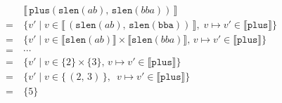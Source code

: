 {\addtolength{\jot}{-.5ex}
\begin{align*}
  & \llbracket\,\texttt{plus}(\texttt{slen}(ab),\,\texttt{slen}(bba))\,\rrbracket \\
=~& \{ v' \mid
       v \in \llbracket\,(\texttt{slen}(ab),\,\texttt{slen}(\texttt{bba}))\,\rrbracket,\;
       v\mapsto v' \in \llbracket\texttt{plus}\rrbracket \} \\
=~& \{ v' \mid
       v \in \llbracket\texttt{slen}(ab)\rrbracket\times
             \llbracket\texttt{slen}(bba)\rrbracket,\,
       v\mapsto v' \in \llbracket\texttt{plus}\rrbracket \} \\
=~& \cdots \\
=~& \{ v' \mid
       v \in \{2\}\times\{3\},\,
       v\mapsto v' \in \llbracket\texttt{plus}\rrbracket \} \\
=~& \{ v' \mid v\in \{\,(2,\,3)\,\},~\;
       v\mapsto v' \in \llbracket\texttt{plus}\rrbracket \} \\
=~& \{5\}
\end{align*}
}


